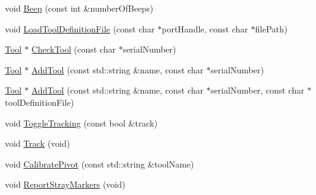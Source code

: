 \begin{DoxyCompactItemize}
\item 
void \hyperlink{classmts_n_d_i_serial_a25982a00da395910da9515daf846c83e}{Beep} (const int \&number\-Of\-Beeps)
\item 
void \hyperlink{classmts_n_d_i_serial_a9e8848fd10c1eedf29ce83553c79f3fb}{Load\-Tool\-Definition\-File} (const char $\ast$port\-Handle, const char $\ast$file\-Path)
\item 
\hyperlink{classmts_n_d_i_serial_1_1_tool}{Tool} $\ast$ \hyperlink{classmts_n_d_i_serial_a3b62c56eb465069a75c2597cdf0da592}{Check\-Tool} (const char $\ast$serial\-Number)
\item 
\hyperlink{classmts_n_d_i_serial_1_1_tool}{Tool} $\ast$ \hyperlink{classmts_n_d_i_serial_a8229beb26f46444a747af55b003b50ff}{Add\-Tool} (const std\-::string \&name, const char $\ast$serial\-Number)
\item 
\hyperlink{classmts_n_d_i_serial_1_1_tool}{Tool} $\ast$ \hyperlink{classmts_n_d_i_serial_abfc2742f954c63b8b88464ced4c8c72e}{Add\-Tool} (const std\-::string \&name, const char $\ast$serial\-Number, const char $\ast$tool\-Definition\-File)
\item 
void \hyperlink{classmts_n_d_i_serial_ad75c633cc225f9c2b9a22ba7916d734f}{Toggle\-Tracking} (const bool \&track)
\item 
void \hyperlink{classmts_n_d_i_serial_a77daeb77f8acf7a18d062eaa7c400d76}{Track} (void)
\item 
void \hyperlink{classmts_n_d_i_serial_a8e8407248f820a59572c4057783d492b}{Calibrate\-Pivot} (const std\-::string \&tool\-Name)
\item 
void \hyperlink{classmts_n_d_i_serial_ad6ad01c2825a54df61bd248d53a14266}{Report\-Stray\-Markers} (void)
\end{DoxyCompactItemize}
